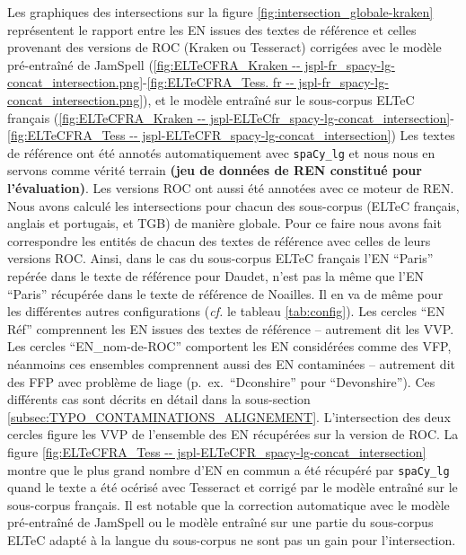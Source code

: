 Les graphiques des intersections sur la figure \ref{fig:intersection_globale-kraken} représentent le rapport entre les EN issues des textes de référence et celles provenant des versions de ROC (Kraken ou Tesseract) corrigées avec le modèle pré-entraîné de JamSpell (\ref{fig:ELTeCFRA_Kraken -- jspl-fr_spacy-lg-concat_intersection.png}-\ref{fig:ELTeCFRA_Tess. fr -- jspl-fr_spacy-lg-concat_intersection.png}), et le modèle entraîné sur le sous-corpus ELTeC français (\ref{fig:ELTeCFRA_Kraken -- jspl-ELTeCfr_spacy-lg-concat_intersection}-\ref{fig:ELTeCFRA_Tess -- jspl-ELTeCFR_spacy-lg-concat_intersection})
Les textes de référence ont été annotés automatiquement avec \texttt{spaCy\_lg} 
et nous nous en servons comme vérité terrain \textbf{(jeu de données de REN constitué pour l'évaluation)}. Les versions ROC ont aussi été annotées avec ce moteur de REN.
Nous avons calculé les intersections pour chacun des sous-corpus (ELTeC français, anglais et portugais, et TGB) de manière globale. Pour ce faire nous avons fait correspondre les entités de chacun des textes de référence avec celles de leurs versions ROC. Ainsi, dans le cas du sous-corpus ELTeC français l'EN ``Paris'' repérée dans le texte de référence pour Daudet, n'est pas la même que l'EN ``Paris'' récupérée dans le texte de référence de Noailles. Il en va de même pour les différentes autres configurations (\textit{cf.} le tableau \ref{tab:config}).
Les cercles ``EN Réf'' comprennent les EN issues des textes de référence -- autrement dit les VVP. Les cercles ``EN\_nom-de-ROC'' comportent les EN considérées comme des VFP, néanmoins ces ensembles comprennent aussi des EN contaminées -- autrement dit des FFP avec problème de liage (p.\ ex.\ ``Dconshire'' pour ``Devonshire''). Ces différents cas sont décrits en détail dans la sous-section \ref{subsec:TYPO_CONTAMINATIONS_ALIGNEMENT}.
L'intersection des deux cercles figure les VVP de l'ensemble des EN récupérées sur la version de ROC.
La figure \ref{fig:ELTeCFRA_Tess -- jspl-ELTeCFR_spacy-lg-concat_intersection} montre que le plus grand nombre d'EN en commun a été récupéré par \texttt{spaCy\_lg} quand le texte a été océrisé avec Tesseract et corrigé par le modèle entraîné sur le sous-corpus français.
 Il est notable que la correction automatique avec le modèle pré-entraîné de JamSpell ou le modèle entraîné sur une partie du sous-corpus ELTeC adapté à la langue du sous-corpus ne sont pas un gain pour l'intersection. 
